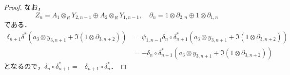 \begin{proof}
  なお，
  \[ Z_n = A_1 \otimes_R Y_{2, n-1} \oplus A_2 \otimes_R Y_{1, n-1},\quad \partial_n = 1 \otimes \partial_{2, n} \oplus 1 \otimes \partial_{1, n}  \]
  である．
  \begin{align*}
    \delta_{n+1} \delta^\ast (a_3 \otimes y_{3, n+1} + \Im (1 \otimes \partial_{3, n+2})) & = \psi_{1, n-1} \delta_n \circ \delta_{n+1}^\ast (a_3 \otimes y_{3, n+1} + \Im (1 \otimes \partial_{3, n+2})) \\
    & = - \delta_n \circ \delta_{n+1}^\ast (a_3 \otimes y_{3, n+1} + \Im (1 \otimes \partial_{3, n+2}))
  \end{align*}
  となるので，$\delta_n \circ \delta_{n+1}^\ast = -\delta_{n+1} \circ \delta_n^\ast$．
\end{proof}

